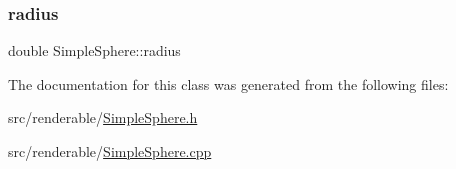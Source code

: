 \subsubsection{\texorpdfstring{radius}{radius}}
{\footnotesize\ttfamily double Simple\+Sphere\+::radius\hspace{0.3cm}{\ttfamily [private]}}



The documentation for this class was generated from the following files\+:\begin{DoxyCompactItemize}
\item 
src/renderable/\mbox{\hyperlink{SimpleSphere_8h}{Simple\+Sphere.\+h}}\item 
src/renderable/\mbox{\hyperlink{SimpleSphere_8cpp}{Simple\+Sphere.\+cpp}}\end{DoxyCompactItemize}
